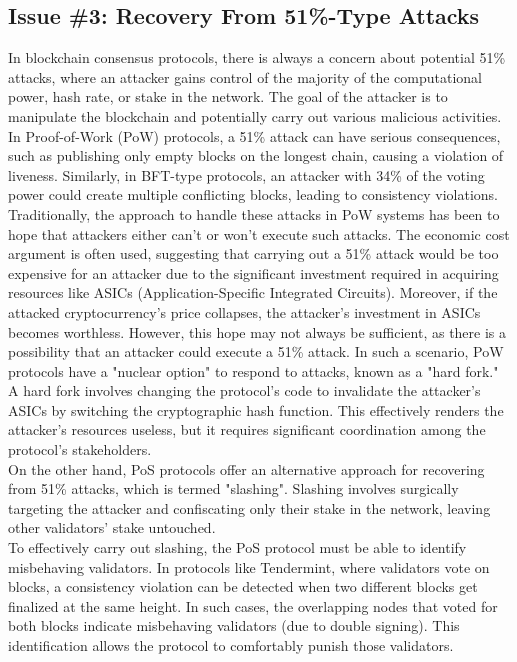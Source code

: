 \subsection{Issue \#3: Recovery From 51\%-Type Attacks}
In blockchain consensus protocols, there is always a concern about potential 51\% attacks, where an attacker gains control of the majority of the computational power, hash rate, or stake in the network. The goal of the attacker is to manipulate the blockchain and potentially carry out various malicious activities.\\
In Proof-of-Work (PoW) protocols, a 51\% attack can have serious consequences, such as publishing only empty blocks on the longest chain, causing a violation of liveness. Similarly, in BFT-type protocols, an attacker with 34\% of the voting power could create multiple conflicting blocks, leading to consistency violations.\\
Traditionally, the approach to handle these attacks in PoW systems has been to hope that attackers either can't or won't execute such attacks. The economic cost argument is often used, suggesting that carrying out a 51\% attack would be too expensive for an attacker due to the significant investment required in acquiring resources like ASICs (Application-Specific Integrated Circuits). Moreover, if the attacked cryptocurrency's price collapses, the attacker's investment in ASICs becomes worthless. However, this hope may not always be sufficient, as there is a possibility that an attacker could execute a 51\% attack. In such a scenario, PoW protocols have a "nuclear option" to respond to attacks, known as a "hard fork." A hard fork involves changing the protocol's code to invalidate the attacker's ASICs by switching the cryptographic hash function. This effectively renders the attacker's resources useless, but it requires significant coordination among the protocol's stakeholders.\\
On the other hand, PoS protocols offer an alternative approach for recovering from 51\% attacks, which is termed "slashing". Slashing involves surgically targeting the attacker and confiscating only their stake in the network, leaving other validators' stake untouched.\\
To effectively carry out slashing, the PoS protocol must be able to identify misbehaving validators. In protocols like Tendermint, where validators vote on blocks, a consistency violation can be detected when two different blocks get finalized at the same height. In such cases, the overlapping nodes that voted for both blocks indicate misbehaving validators (due to double signing). This identification allows the protocol to comfortably punish those validators.\\
